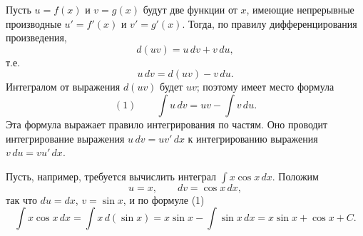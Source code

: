 \begin{rusblock}
Пусть $u=f(x)$ и $v=g(x)$ будут две функции от $x$, имеющие непрерывные производные $u'=f'(x)$ и $v'=g'(x)$. Тогда, по правилу дифференцирования произведения,
\[
d(uv)=u\,dv+v\,du,
\]
т.е.
\[
u\,dv=d(uv)-v\,du.
\]
Интегралом от выражения $d(uv)$ будет $uv$; поэтому имеет место формула
\[(1)\qquad \int u\,dv=uv-\int v\,du.
\]
Эта формула выражает правило интегрирования по частям. Оно проводит интегрирование выражения $u\,dv=uv'\,dx$ к интегрированию выражения $v\,du=vu'\,dx$.

Пусть, например, требуется вычислить интеграл $\int x\cos x\,dx$. Положим
\[
u=x,\qquad dv=\cos x\,dx,
\]
так что $du=dx$, $v=\sin x$, и по формуле (1)
\[
\int x\cos x\,dx=\int x\,d(\sin x)=x\sin x-\int\sin x\,dx=x\sin x+\cos x+C.
\]
\end{rusblock}

